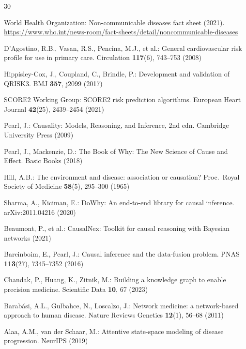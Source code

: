 \documentclass[runningheads]{llncs}
\begin{document}
\begin{thebibliography}{30}

World Health Organization:
Non-communicable diseases fact sheet (2021).
\url{https://www.who.int/news-room/fact-sheets/detail/noncommunicable-diseases}

D'Agostino, R.B., Vasan, R.S., Pencina, M.J., et al.:
General cardiovascular risk profile for use in primary care.
Circulation \textbf{117}(6), 743--753 (2008)

Hippisley-Cox, J., Coupland, C., Brindle, P.:
Development and validation of QRISK3.
BMJ \textbf{357}, j2099 (2017)

SCORE2 Working Group:
SCORE2 risk prediction algorithms.
European Heart Journal \textbf{42}(25), 2439--2454 (2021)

Pearl, J.:
Causality: Models, Reasoning, and Inference, 2nd edn.
Cambridge University Press (2009)

Pearl, J., Mackenzie, D.:
The Book of Why: The New Science of Cause and Effect.
Basic Books (2018)

Hill, A.B.:
The environment and disease: association or causation?
Proc.\ Royal Society of Medicine \textbf{58}(5), 295--300 (1965)

Sharma, A., Kiciman, E.:
DoWhy: An end-to-end library for causal inference.
arXiv:2011.04216 (2020)

Beaumont, P., et al.:
CausalNex: Toolkit for causal reasoning with Bayesian networks (2021)

Bareinboim, E., Pearl, J.:
Causal inference and the data-fusion problem.
PNAS \textbf{113}(27), 7345--7352 (2016)

Chandak, P., Huang, K., Zitnik, M.:
Building a knowledge graph to enable precision medicine.
Scientific Data \textbf{10}, 67 (2023)

Barab\'{a}si, A.L., Gulbahce, N., Loscalzo, J.:
Network medicine: a network-based approach to human disease.
Nature Reviews Genetics \textbf{12}(1), 56--68 (2011)

Alaa, A.M., van der Schaar, M.:
Attentive state-space modeling of disease progression.
NeurIPS (2019)


\end{thebibliography}
\end{document}
